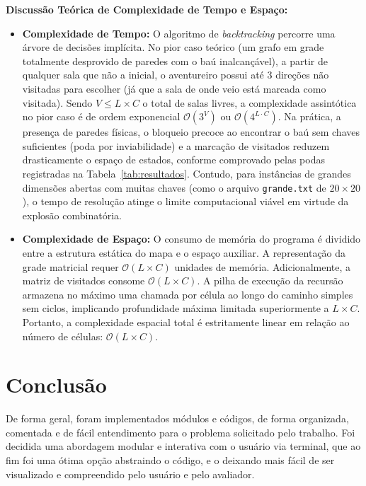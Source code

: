 \documentclass[12pt,a4paper]{article}
\renewcommand{\_}{\textunderscore\allowbreak}
\begin{document}
\textbf{Discussão Teórica de Complexidade de Tempo e Espaço:}
\begin{itemize}
    \item \textbf{Complexidade de Tempo:} O algoritmo de \textit{backtracking} percorre uma árvore de decisões implícita. No pior caso teórico (um grafo em grade totalmente desprovido de paredes com o baú inalcançável), a partir de qualquer sala que não a inicial, o aventureiro possui até 3 direções não visitadas para escolher (já que a sala de onde veio está marcada como visitada). Sendo $V \le L \times C$ o total de salas livres, a complexidade assintótica no pior caso é de ordem exponencial $\mathcal{O}(3^V)$ ou $\mathcal{O}(4^{L \cdot C})$. Na prática, a presença de paredes físicas, o bloqueio precoce ao encontrar o baú sem chaves suficientes (poda por inviabilidade) e a marcação de visitados reduzem drasticamente o espaço de estados, conforme comprovado pelas podas registradas na Tabela~\ref{tab:resultados}. Contudo, para instâncias de grandes dimensões abertas com muitas chaves (como o arquivo \texttt{grande.txt} de $20 \times 20$), o tempo de resolução atinge o limite computacional viável em virtude da explosão combinatória.
    \item \textbf{Complexidade de Espaço:} O consumo de memória do programa é dividido entre a estrutura estática do mapa e o espaço auxiliar. A representação da grade matricial requer $\mathcal{O}(L \times C)$ unidades de memória. Adicionalmente, a matriz de visitados consome $\mathcal{O}(L \times C)$. A pilha de execução da recursão armazena no máximo uma chamada por célula ao longo do caminho simples sem ciclos, implicando profundidade máxima limitada superiormente a $L \times C$. Portanto, a complexidade espacial total é estritamente linear em relação ao número de células: $\mathcal{O}(L \times C)$.
\end{itemize}

\newpage
\section{Conclusão}

De forma geral, foram implementados módulos e códigos, de forma organizada, comentada e de fácil entendimento para o problema solicitado pelo trabalho. Foi decidida uma abordagem modular e interativa com o usuário via terminal, que ao fim foi uma ótima opção abstraindo o código, e o deixando mais fácil de ser visualizado e compreendido pelo usuário e pelo avaliador.
\end{document}
